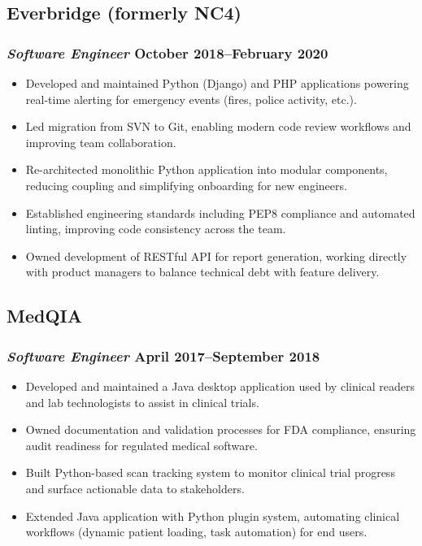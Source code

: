 \documentclass{article}
\begin{document}
\begin{minipage}[t]{.6\textwidth}
	\subsection*{Everbridge (formerly NC4)}
	\subsubsection*{\textit{Software Engineer} \hfill October 2018--February 2020}
	\begin{itemize}
		\item Developed and maintained Python (Django) and PHP applications
		      powering real-time alerting for emergency events (fires, police
		      activity, etc.).
		\item Led migration from SVN to Git, enabling modern code review
		      workflows and improving team collaboration.
		\item Re-architected monolithic Python application into modular
		      components, reducing coupling and simplifying onboarding for new
		      engineers.
		\item Established engineering standards including PEP8 compliance and
		      automated linting, improving code consistency across the team.
		\item Owned development of RESTful API for report generation, working
		      directly with product managers to balance technical debt with
		      feature delivery.
	\end{itemize}
	\subsection*{MedQIA}
	\subsubsection*{\textit{Software Engineer} \hfill April 2017--September 2018}
	\begin{itemize}
		\item Developed and maintained a Java desktop application used by
		      clinical readers and lab technologists to assist in clinical trials.
		\item Owned documentation and validation processes for FDA compliance,
		      ensuring audit readiness for regulated medical software.
		\item Built Python-based scan tracking system to monitor clinical trial
		      progress and surface actionable data to stakeholders.
		\item Extended Java application with Python plugin system, automating
		      clinical workflows (dynamic patient loading, task automation) for
		      end users.
	\end{itemize}
\end{minipage}
\end{document}
